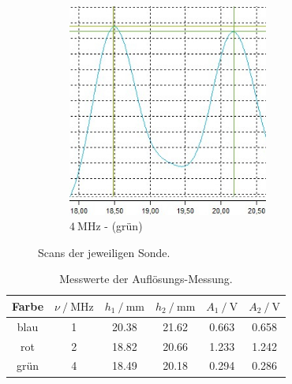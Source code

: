 \begin{figure}
    \begin{subfigure}{0.5\textwidth}
        \centering
        \includegraphics[height=7cm]{content/bilder/a-scan-gruen.jpg}
        \caption{$\SI{4}{\mega\hertz}$ - (grün)}
        \label{fig:4mhz}
    \end{subfigure}
    \caption{Scans der jeweiligen Sonde.}
    \label{fig:aufloesung}
\end{figure}

\begin{table}
    \centering
    \caption{Messwerte der Auflösungs-Messung.}
    \label{tab:aufloesung}
    \begin{tabular}{c S[table-format=1.0]
        S[table-format=2.2] S[table-format=2.2]
        S[table-format=1.3] S[table-format=1.3]}
        \toprule
        {Farbe}
        & {$ν\:/\:\si{\mega\hertz}$}
        & {$h_1\:/\:\si{\milli\meter}$}
        & {$h_2\:/\:\si{\milli\meter}$}
        & {$A_1\:/\:\si{\volt}$}
        & {$A_2\:/\:\si{\volt}$}\\
        \midrule
        blau & 1 & 20.38 & 21.62 & 0.663 & 0.658 \\
        rot  & 2 & 18.82 & 20.66 & 1.233 & 1.242 \\
        grün & 4 & 18.49 & 20.18 & 0.294 & 0.286 \\
        \bottomrule
    \end{tabular}
\end{table}
